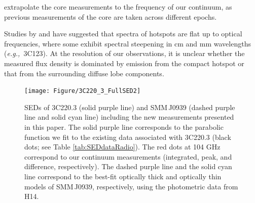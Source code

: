 \documentclass[iop]{emulateapj}
\newcommand{\eg}{{\sl e.g.,~}}
\begin{document}
 extrapolate the core measurements to the frequency of our continuum, as previous measurements of the core are 
 taken 
 across different epochs. 
\par
Studies by \citet{Meisenheimer89a} and \citet{Hardcastle08a} have suggested that spectra of hotspots are flat up to optical frequencies, where some exhibit spectral steepening in cm and mm wavelengths (\eg 3C123). At the resolution of our observations, it is unclear whether the measured flux density is dominated by emission from the compact hotspot or that from the surrounding diffuse lobe components.

\begin{figure}[!tbph]
\centering
\texttt{[image: Figure/3C220\_3\_FullSED2]}
\caption{SEDs of 3C220.3 (solid purple line) and SMM\,J0939 (dashed purple line and solid cyan line) including the new measurements presented in this paper.
The solid purple line corresponds to the parabolic function we
fit to the existing data associated with 3C220.3 (black dots; see Table \ref{tab:SEDdataRadio}).
The red dots at 104 GHz correspond to
our continuum measurements (integrated, peak, and difference, respectively).
The dashed purple line and
the solid cyan line correspond to the best-fit optically thick and optically thin models of SMM\,J0939, respectively, using the photometric data from H14. \label{fig:SED}}
\end{figure}
\end{document}
